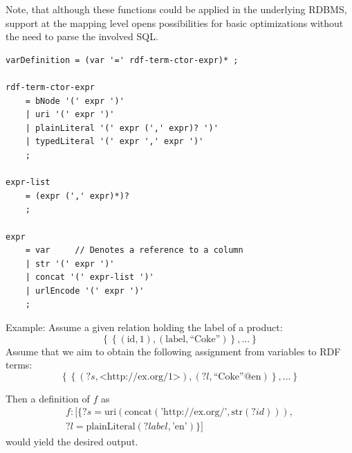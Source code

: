 
Note, that although these functions could
be applied in the underlying RDBMS, support at the mapping level opens
possibilities for basic optimizations without the need to parse the involved
SQL.


\begin{lstlisting}[caption=EBNF for variable definition expressions, label=lst:vardef]
varDefinition = (var '=' rdf-term-ctor-expr)* ;

rdf-term-ctor-expr
    = bNode '(' expr ')'
    | uri '(' expr ')'
    | plainLiteral '(' expr (',' expr)? ')'
    | typedLiteral '(' expr ',' expr ')'
    ;

expr-list
    = (expr (',' expr)*)?
    ;

expr
    = var     // Denotes a reference to a column
    | str '(' expr ')'
    | concat '(' expr-list ')'
    | urlEncode '(' expr ')'
    ;
\end{lstlisting}

Example:
Assume a given relation holding the label of a product:
\[
\left\{ \left\{ (\text{id}, \text{1}), (\text{label}, \text{``Coke''}) \right\}, \ldots \right\}
\]
Assume that we aim to obtain the following assignment from variables
to RDF terms:
\[
\left\{ \left\{ (?s, \text{<http://ex.org/1>}), (?l, \text{``Coke''@en}) \right\}, \ldots
\right\}
\]

Then a definition of $f$ as
\begin{multline}
f: [\{ ?s = \text{uri}(\text{concat}(\text{'http://ex.org/'}, \text{str}(?id))), \\
      ?l = \text{plainLiteral}(?label, \text{'en'})
\}]
\end{multline}
would yield the desired output.


